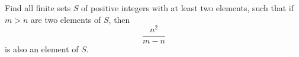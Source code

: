 Find all finite sets $S$ of positive integers with at least two elements,
such that if $m>n$ are two elements of $S$, then
$$\frac{n^2}{m-n}$$
is also an element of $S$.
